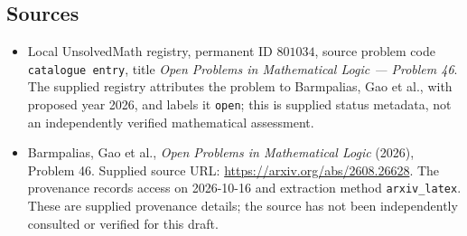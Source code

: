 \documentclass[11pt]{article}
\begin{document}
\subsection{Sources}
\begin{itemize}
\item Local UnsolvedMath registry, permanent ID \(801034\), source problem code \texttt{catalogue entry}, title \emph{Open Problems in Mathematical Logic --- Problem 46}. The supplied registry attributes the problem to Barmpalias, Gao et al., with proposed year 2026, and labels it \texttt{open}; this is supplied status metadata, not an independently verified mathematical assessment.
\item Barmpalias, Gao et al., \emph{Open Problems in Mathematical Logic} (2026), Problem 46. Supplied source URL: \url{https://arxiv.org/abs/2608.26628}. The provenance records access on 2026-10-16 and extraction method \texttt{arxiv\_latex}. These are supplied provenance details; the source has not been independently consulted or verified for this draft.
\end{itemize}
\end{document}
